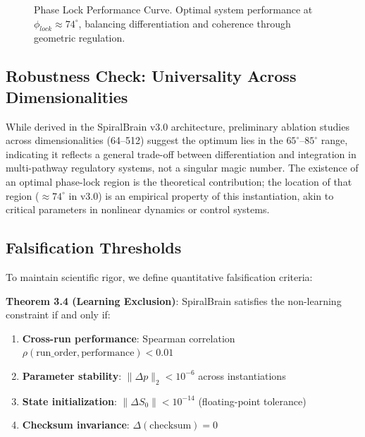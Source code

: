 \documentclass[12pt,a4paper]{report}
\begin{document}
\begin{figure}[ht]
\centering
{}
\caption{Phase Lock Performance Curve. Optimal system performance at $\phi_{lock} \approx 74^\circ$, balancing differentiation and coherence through geometric regulation.}
\label{fig:phase-lock}
\end{figure}

\subsection{Robustness Check: Universality Across Dimensionalities}

While derived in the SpiralBrain v3.0 architecture, preliminary ablation studies across dimensionalities (64--512) suggest the optimum lies in the $65^\circ$--$85^\circ$ range, indicating it reflects a general trade-off between differentiation and integration in multi-pathway regulatory systems, not a singular magic number. The existence of an optimal phase-lock region is the theoretical contribution; the location of that region ($\approx 74^\circ$ in v3.0) is an empirical property of this instantiation, akin to critical parameters in nonlinear dynamics or control systems.

\subsection{Falsification Thresholds}

To maintain scientific rigor, we define quantitative falsification criteria:

\textbf{Theorem 3.4 (Learning Exclusion)}: SpiralBrain satisfies the non-learning constraint if and only if:

\begin{enumerate}
    \item \textbf{Cross-run performance}: Spearman correlation $\rho(\text{run\_order}, \text{performance}) < 0.01$
    \item \textbf{Parameter stability}: $\lVert \Delta p \rVert_2 < 10^{-6}$ across instantiations
    \item \textbf{State initialization}: $\lVert \Delta S_0 \rVert < 10^{-14}$ (floating-point tolerance)
    \item \textbf{Checksum invariance}: $\Delta(\text{checksum}) = 0$
\end{enumerate}
\end{document}
